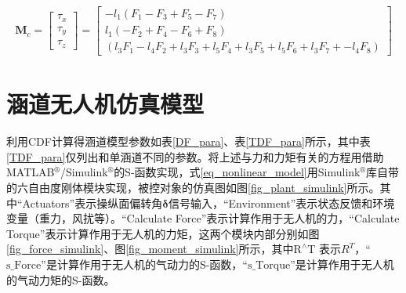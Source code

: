 \begin{align}\bm{M}_{c}=
\begin{bmatrix}
\tau_{x } \\
\tau_{y } \\
\tau_{z }
\end{bmatrix}
=
\begin{bmatrix}
-{{l}_{1}}\left(F_1-F_3+F_5-F_7\right) \\
{{l}_{1}}\left(-F_2+F_4-F_6+F_8\right) \\
\left(l_3 F_{1} - l_4 F_{2} + l_3 F_{3} + l_5 F_{4} + l_3 F_5 + l_5 F_6 + l_3 F_7 + -l_4 F_8 \right)
\end{bmatrix}	\label{eq_TDF_M_c}
\end{align}	
\section{涵道无人机仿真模型}
利用CDF计算得涵道模型参数如表\ref{DF_para}、表\ref{TDF_para}所示，其中表\ref{TDF_para}仅列出和单涵道不同的参数。将上述与力和力矩有关的方程用借助MATLAB$^\circledR$/Simulink$^\circledR$的S-函数实现，式\eqref{eq_nonlinear_model}用Simulink$^\circledR$库自带的六自由度刚体模块实现，被控对象的仿真图如图\ref{fig_plant_simulink}所示。其中“Actuators”表示操纵面偏转角$ \bm{\delta} $信号输入，“Environment”表示状态反馈和环境变量（重力，风扰等）。“Calculate Force”表示计算作用于无人机的力，“Calculate Torque”表示计算作用于无人机的力矩，这两个模块内部分别如图\ref{fig_force_simulink}、图\ref{fig_moment_simulink}所示，其中$\mathrm{R}^{\wedge} \mathrm{T}$ 表示$ R^T $，“$ \mathrm{s\_{}Force} $”是计算作用于无人机的气动力的S-函数，“$ \mathrm{s\_{}Torque} $”是计算作用于无人机的气动力矩的S-函数。

